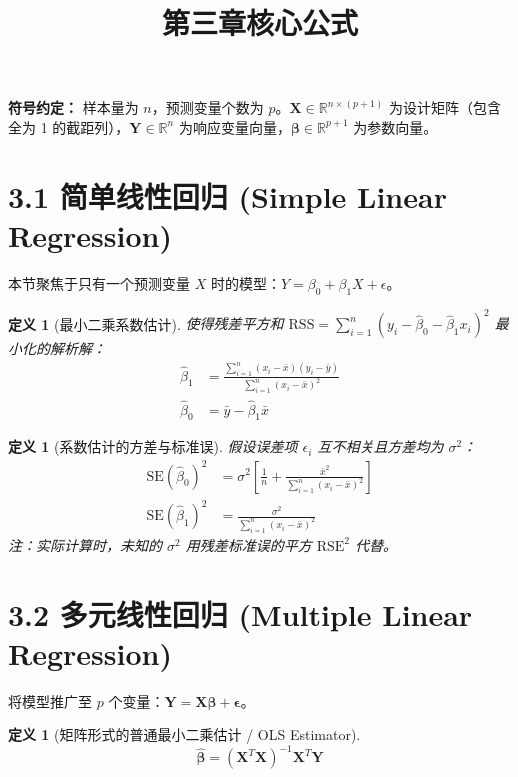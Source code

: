 \documentclass[UTF8]{ctexart}
\title{第三章核心公式}
\date{}
\newtheorem{definition}[theorem]{定义}
\numberwithin{equation}{section}
\newcommand{\RR}{\mathbb{R}}
\newcommand{\SE}{\text{SE}}
\newcommand{\RSS}{\text{RSS}}
\newcommand{\RSE}{\text{RSE}}
\begin{document}
\maketitle

\noindent \textbf{符号约定：} 样本量为 $n$，预测变量个数为 $p$。$\mathbf{X} \in \RR^{n \times (p+1)}$ 为设计矩阵（包含全为 1 的截距列），$\mathbf{Y} \in \RR^n$ 为响应变量向量，$\boldsymbol{\beta} \in \RR^{p+1}$ 为参数向量。

\section{3.1 简单线性回归 (Simple Linear Regression)}
本节聚焦于只有一个预测变量 $X$ 时的模型：$Y = \beta_0 + \beta_1 X + \epsilon$。

\begin{definition}[最小二乘系数估计]
使得残差平方和 $\RSS = \sum_{i=1}^n (y_i - \hat{\beta}_0 - \hat{\beta}_1 x_i)^2$ 最小化的解析解：
\begin{align}
\hat{\beta}_1 &= \frac{\sum_{i=1}^n (x_i - \bar{x})(y_i - \bar{y})}{\sum_{i=1}^n (x_i - \bar{x})^2} \\
\hat{\beta}_0 &= \bar{y} - \hat{\beta}_1 \bar{x}
\end{align}
\end{definition}

\begin{definition}[系数估计的方差与标准误]
假设误差项 $\epsilon_i$ 互不相关且方差均为 $\sigma^2$：
\begin{align}
\SE(\hat{\beta}_0)^2 &= \sigma^2 \left[ \frac{1}{n} + \frac{\bar{x}^2}{\sum_{i=1}^n (x_i - \bar{x})^2} \right] \\
\SE(\hat{\beta}_1)^2 &= \frac{\sigma^2}{\sum_{i=1}^n (x_i - \bar{x})^2}
\end{align}
\emph{注：实际计算时，未知的 $\sigma^2$ 用残差标准误的平方 $\RSE^2$ 代替。}
\end{definition}

\section{3.2 多元线性回归 (Multiple Linear Regression)}
将模型推广至 $p$ 个变量：$\mathbf{Y} = \mathbf{X}\boldsymbol{\beta} + \boldsymbol{\epsilon}$。

\begin{definition}[矩阵形式的普通最小二乘估计 / OLS Estimator]
\begin{equation}
\hat{\boldsymbol{\beta}} = (\mathbf{X}^T\mathbf{X})^{-1}\mathbf{X}^T\mathbf{Y}
\end{equation}
\end{definition}
\end{document}
